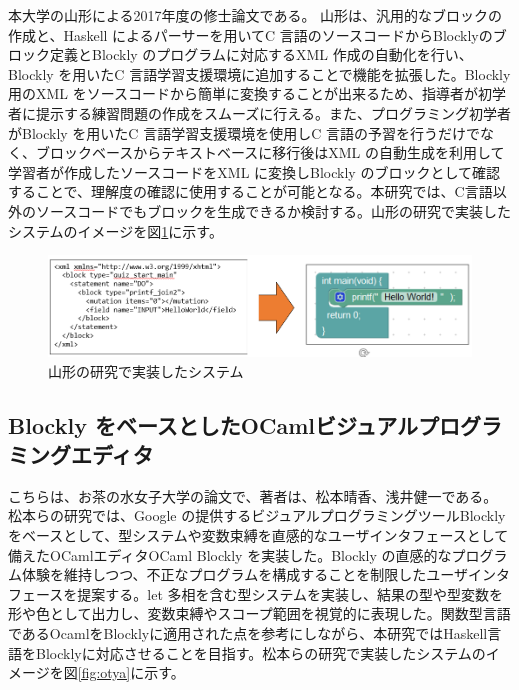 \documentclass{risepaper}
\begin{document}
  本大学の山形による2017年度の修士論文\cite{yamagata}\cite{yamagata2}である。
 山形は、汎用的なブロックの作成と、Haskell によるパーサーを用いてC 言語のソースコードからBlocklyのブロック定義とBlockly のプログラムに対応するXML 作成の自動化を行い、Blockly を用いたC 言語学習支援環境に追加することで機能を拡張した。Blockly 用のXML をソースコードから簡単に変換することが出来るため、指導者が初学者に提示する練習問題の作成をスムーズに行える。また、プログラミング初学者がBlockly を用いたC 言語学習支援環境を使用しC 言語の予習を行うだけでなく、ブロックベースからテキストベースに移行後はXML の自動生成を利用して学習者が作成したソースコードをXML に変換しBlockly のブロックとして確認することで、理解度の確認に使用することが可能となる。本研究では、C言語以外のソースコードでもブロックを生成できるか検討する。山形の研究で実装したシステムのイメージを図\ref{fig:yamagata}に示す。 
 
\begin{figure}[h]
\begin{center}
\includegraphics[scale=0.8]{img/yamagata.PNG}
\caption{山形の研究で実装したシステム}%
\label{fig:yamagata}
\end{center}%
\end{figure}%

	\subsection{Blockly をベースとしたOCamlビジュアルプログラミングエディタ}
    
こちらは、お茶の水女子大学の論文\cite{otya}で、著者は、松本晴香、浅井健一である。
松本らの研究では、Google の提供するビジュアルプログラミングツールBlockly をベースとして、型システムや変数束縛を直感的なユーザインタフェースとして備えたOCamlエディタOCaml Blockly を実装した。Blockly の直感的なプログラム体験を維持しつつ、不正なプログラムを構成することを制限したユーザインタフェースを提案する。let 多相を含む型システムを実装し、結果の型や型変数を形や色として出力し、変数束縛やスコープ範囲を視覚的に表現した。関数型言語であるOcamlをBlocklyに適用された点を参考にしながら、本研究ではHaskell言語をBlocklyに対応させることを目指す。松本らの研究で実装したシステムのイメージを図\ref{fig:otya}に示す。 
\end{document}
